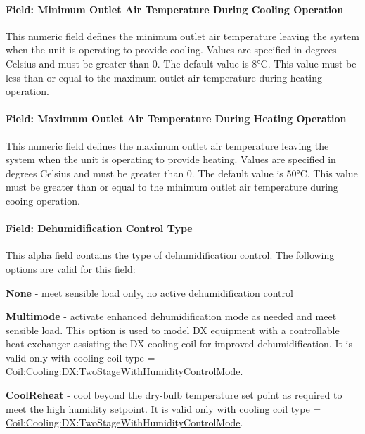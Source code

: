 \paragraph{Field: Minimum Outlet Air Temperature During Cooling Operation}\label{field-minimum-outlet-air-temperature-during-cooling-operation}

This numeric field defines the minimum outlet air temperature leaving the system when the unit is operating to provide cooling. Values are specified in degrees Celsius and must be greater than 0. The default value is 8°C. This value must be less than or equal to the maximum outlet air temperature during heating operation.

\paragraph{Field: Maximum Outlet Air Temperature During Heating Operation}\label{field-maximum-outlet-air-temperature-during-heating-operation}

This numeric field defines the maximum outlet air temperature leaving the system when the unit is operating to provide heating. Values are specified in degrees Celsius and must be greater than 0. The default value is 50°C. This value must be greater than or equal to the minimum outlet air temperature during cooing operation.

\paragraph{Field: Dehumidification Control Type}\label{field-dehumidification-control-type-5-000}

This alpha field contains the type of dehumidification control. The following options are valid for this field:

\textbf{None} - meet sensible load only, no active dehumidification control

\textbf{Multimode} - activate enhanced dehumidification mode as needed and meet sensible load. This option is used to model DX equipment with a controllable heat exchanger assisting the DX cooling coil for improved dehumidification. It is valid only with cooling coil type = \hyperref[coilcoolingdxtwostagewithhumiditycontrolmode]{Coil:Cooling:DX:TwoStageWithHumidityControlMode}.

\textbf{CoolReheat} - cool beyond the dry-bulb temperature set point as required to meet the high humidity setpoint. It is valid only with cooling coil type = \hyperref[coilcoolingdxtwostagewithhumiditycontrolmode]{Coil:Cooling:DX:TwoStageWithHumidityControlMode}.

